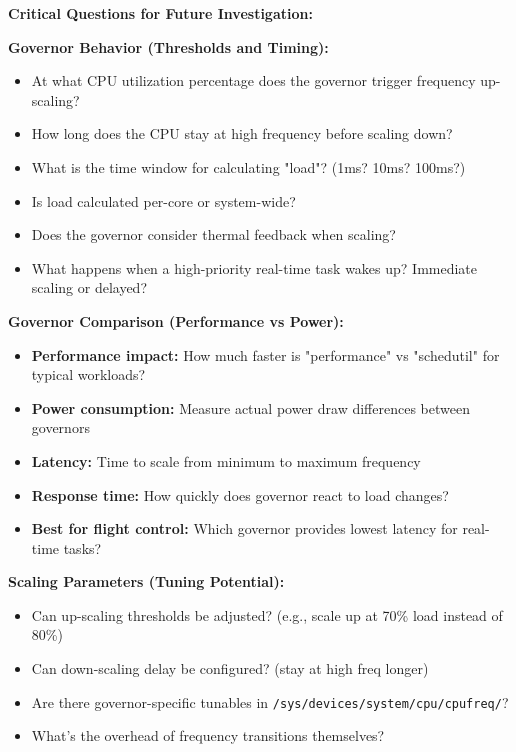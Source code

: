\documentclass[12pt,a4paper]{report}
\begin{document}
\begin{important}
\textbf{Critical Questions for Future Investigation:}

\textbf{Governor Behavior (Thresholds and Timing):}
\begin{itemize}
    \item At what CPU utilization percentage does the governor trigger frequency up-scaling?
    \item How long does the CPU stay at high frequency before scaling down?
    \item What is the time window for calculating "load"? (1ms? 10ms? 100ms?)
    \item Is load calculated per-core or system-wide?
    \item Does the governor consider thermal feedback when scaling?
    \item What happens when a high-priority real-time task wakes up? Immediate scaling or delayed?
\end{itemize}

\textbf{Governor Comparison (Performance vs Power):}
\begin{itemize}
    \item \textbf{Performance impact:} How much faster is "performance" vs "schedutil" for typical workloads?
    \item \textbf{Power consumption:} Measure actual power draw differences between governors
    \item \textbf{Latency:} Time to scale from minimum to maximum frequency
    \item \textbf{Response time:} How quickly does governor react to load changes?
    \item \textbf{Best for flight control:} Which governor provides lowest latency for real-time tasks?
\end{itemize}

\textbf{Scaling Parameters (Tuning Potential):}
\begin{itemize}
    \item Can up-scaling thresholds be adjusted? (e.g., scale up at 70\% load instead of 80\%)
    \item Can down-scaling delay be configured? (stay at high freq longer)
    \item Are there governor-specific tunables in \texttt{/sys/devices/system/cpu/cpufreq/}?
    \item What's the overhead of frequency transitions themselves?
\end{itemize}
\end{important}
\end{document}
